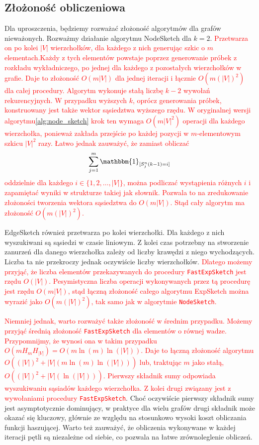     \subsection{Złożoność obliczeniowa}
    \label{sec:complexity}
    Dla uproszczenia, będziemy rozważać złożoność algorytmów dla grafów nieważonych. Rozważmy działanie algorytmu NodeSketch dla $k = 2$. \textcolor{red}{Przetwarza on po kolei $|V|$ wierzchołków, dla każdego z nich generując szkic o $m$ elementach.Każdy z tych elementów powstaje poprzez generowanie próbek z rozkładu wykładniczego, po jednej dla każdego z pozostałych wierzchołków w grafie. Daje to złożoność $O(m|V|)$ dla jednej iteracji i łącznie $O(m(|V|)^2)$ dla całej procedury. Algorytm wykonuje stałą liczbę $k - 2$ wywołań rekurencyjnych. W przypadku wyższych $k$, oprócz generowania próbek, konstruowany jest także wektor sąsiedztwa wyższego rzędu. W oryginalnej wersji algorytmu\ref{alg:node_sketch} krok ten wymaga $O(m|V|^2)$ operacji dla każdego wierzchołka, ponieważ zakłada przejście po każdej pozycji w $m$-elementowym szkicu $|V|^2$ razy. Łatwo jednak zauważyć, że zamiast obliczać 
    \[
        \sum\limits_{j = 1}^{m} \mathbbm{1}_{[S_{j}^{n}(k - 1) = i]}
    \]
    oddzielnie dla każdego $i \in \{1,2,\dots,|V|\}$, można podliczać wystąpienia różnych $i$ i zapamiętać wyniki w strukturze takiej jak słownik. Pozwala to na zredukowanie złożoności tworzenia wektora sąsiedztwa do $O(m|V|)$. Stąd cały algorytm ma złożoność $O(m(|V|)^2)$.}
    
     EdgeSketch również przetwarza po kolei wierzchołki. Dla każdego z nich wyszukiwani są sąsiedzi w czasie liniowym. Z kolei czas potrzebny na stworzenie zanurzeń dla danego wierzchołka zależy od liczby krawędzi z niego wychodzących. Liczba ta nie przekroczy jednak oczywiście liczby wierzchołków. \textcolor{red}{Dlatego możemy przyjąć, że liczba elementów przekazywanych do procedury \texttt{FastExpSketch} jest rzędu $O(|V|)$. Pesymistyczna liczba operacji wykonywanych przez tą procedurę jest rzędu $O(m|V|)$, stąd łączną złożoność całego algorytmu ExpSketch można wyrazić jako $O(m(|V|)^2)$, tak samo jak w algorytmie \texttt{NodeSketch}.} 
     
     \textcolor{red}{Niemniej jednak, warto rozważyć także złożoność w średnim przypadku. Możemy przyjąć średnią złożoność \texttt{FastExpSketch} dla elementów o równej wadze. Przypomnijmy, że wynosi ona w takim przypadku $O(m H_m H_{|V|}) = O(m \ln(m) \ln(|V|))$. Daje to łączną złożoność algorytmu $O((|V|)^2 + |V|(m \ln(m) \ln(|V|)))$ lub, traktując $m$ jako stałą, $O((|V|)^2 + |V|(\ln(|V|)))$. Pierwszy składnik sumy odpowiada wyszukiwaniu sąsiadów każdego wierzchołka. Z kolei drugi związany jest z wywołaniami procedury  \texttt{FastExpSketch}}. Choć oczywiście pierwszy składnik sumy jest asymptotycznie dominujący, w praktyce dla wielu grafów drugi składnik może okazać się kluczowy, głównie ze względu na stosunkowo wysoki koszt obliczania funkcji haszującej. Warto też zauważyć, że obliczenia wykonywane w każdej iteracji pętli są niezależne od siebie, co pozwala na łatwe zrównoleglenie obliczeń. 
     
